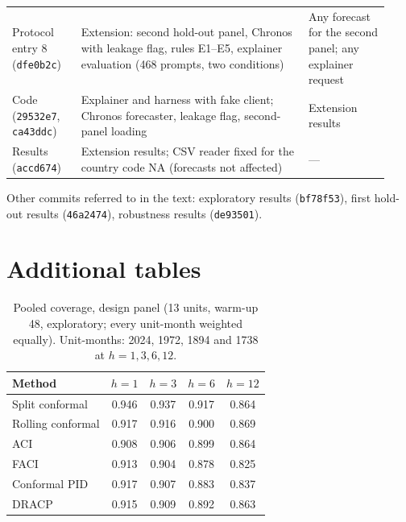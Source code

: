 \begin{table}[H]
\begin{tabular}{@{}p{0.17\linewidth}p{0.56\linewidth}p{0.20\linewidth}@{}}
Protocol entry 8 (\texttt{dfe0b2c}) & Extension: second hold-out panel, Chronos with leakage flag, rules E1--E5, explainer evaluation (468 prompts, two conditions) & Any forecast for the second panel; any explainer request \\
Code (\texttt{29532e7}, \texttt{ca43ddc}) & Explainer and harness with fake client; Chronos forecaster, leakage flag, second-panel loading & Extension results \\
Results (\texttt{accd674}) & Extension results; CSV reader fixed for the country code NA (forecasts not affected) & --- \\
\bottomrule
\end{tabular}
\end{table}

Other commits referred to in the text: exploratory results (\texttt{bf78f53}), first hold-out results (\texttt{46a2474}), robustness results (\texttt{de93501}).

\section{Additional tables}\label{app:extra}

\begin{table}[H]
\centering
\caption{Pooled coverage, design panel (13 units, warm-up 48, exploratory; every unit-month weighted equally). Unit-months: 2024, 1972, 1894 and 1738 at $h=1,3,6,12$.}
\label{tab:pooled_expl}
\small
\begin{tabular}{@{}lcccc@{}}
\toprule
Method & $h=1$ & $h=3$ & $h=6$ & $h=12$ \\
\midrule
Split conformal & 0.946 & 0.937 & 0.917 & 0.864 \\
Rolling conformal & 0.917 & 0.916 & 0.900 & 0.869 \\
ACI & 0.908 & 0.906 & 0.899 & 0.864 \\
FACI & 0.913 & 0.904 & 0.878 & 0.825 \\
Conformal PID & 0.917 & 0.907 & 0.883 & 0.837 \\
DRACP & 0.915 & 0.909 & 0.892 & 0.863 \\
\bottomrule
\end{tabular}
\end{table}

